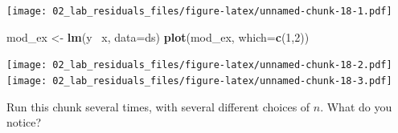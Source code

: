 \documentclass[]{article}
\newenvironment{Shaded}{\begin{snugshade}}{\end{snugshade}}
\newcommand{\KeywordTok}[1]{\textcolor[rgb]{0.13,0.29,0.53}{\textbf{{#1}}}}
\newcommand{\DataTypeTok}[1]{\textcolor[rgb]{0.13,0.29,0.53}{{#1}}}
\newcommand{\DecValTok}[1]{\textcolor[rgb]{0.00,0.00,0.81}{{#1}}}
\newcommand{\StringTok}[1]{\textcolor[rgb]{0.31,0.60,0.02}{{#1}}}
\newcommand{\NormalTok}[1]{{#1}}
\begin{document}
\texttt{[image: 02\_lab\_residuals\_files/figure-latex/unnamed-chunk-18-1.pdf]}

\begin{Shaded}
\begin{Highlighting}[]
\NormalTok{mod_ex <-}\StringTok{ }\KeywordTok{lm}\NormalTok{(y ~x, }\DataTypeTok{data=}\NormalTok{ds)}
\KeywordTok{plot}\NormalTok{(mod_ex, }\DataTypeTok{which=}\KeywordTok{c}\NormalTok{(}\DecValTok{1}\NormalTok{,}\DecValTok{2}\NormalTok{))}
\end{Highlighting}
\end{Shaded}

\texttt{[image: 02\_lab\_residuals\_files/figure-latex/unnamed-chunk-18-2.pdf]}
\texttt{[image: 02\_lab\_residuals\_files/figure-latex/unnamed-chunk-18-3.pdf]}

Run this chunk several times, with several different choices of \(n\).
What do you notice?
\end{document}
